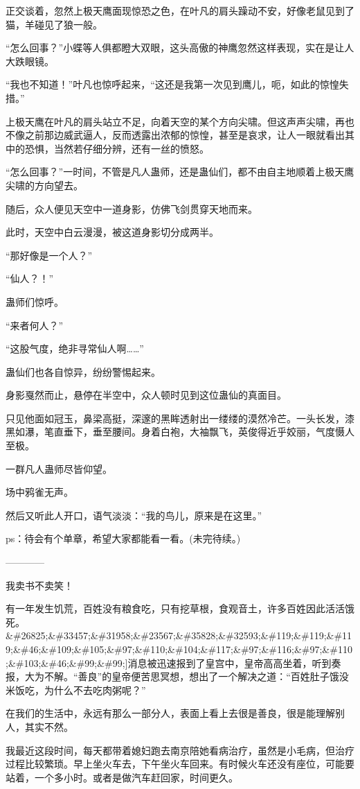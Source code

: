 \begin{this_body}
正交谈着，忽然上极天鹰面现惊恐之色，在叶凡的肩头躁动不安，好像老鼠见到了猫，羊碰见了狼一般。

“怎么回事？”小蝶等人俱都瞪大双眼，这头高傲的神鹰忽然这样表现，实在是让人大跌眼镜。

“我也不知道！”叶凡也惊呼起来，“这还是我第一次见到鹰儿，呃，如此的惊惶失措。”

上极天鹰在叶凡的肩头站立不足，向着天空的某个方向尖啸。但这声声尖啸，再也不像之前那边威武逼人，反而透露出浓郁的惊惶，甚至是哀求，让人一眼就看出其中的恐惧，当然若仔细分辨，还有一丝的愤怒。

“怎么回事？”一时间，不管是凡人蛊师，还是蛊仙们，都不由自主地顺着上极天鹰尖啸的方向望去。

随后，众人便见天空中一道身影，仿佛飞剑贯穿天地而来。

此时，天空中白云漫漫，被这道身影切分成两半。

“那好像是一个人？”

“仙人？！”

蛊师们惊呼。

“来者何人？”

“这股气度，绝非寻常仙人啊……”

蛊仙们也各自惊异，纷纷警惕起来。

身影戛然而止，悬停在半空中，众人顿时见到这位蛊仙的真面目。

只见他面如冠玉，鼻梁高挺，深邃的黑眸透射出一缕缕的漠然冷芒。一头长发，漆黑如瀑，笔直垂下，垂至腰间。身着白袍，大袖飘飞，英俊得近乎姣丽，气度慑人至极。

一群凡人蛊师尽皆仰望。

场中鸦雀无声。

然后又听此人开口，语气淡淡：“我的鸟儿，原来是在这里。”

ps：待会有个单章，希望大家都能看一看。(未完待续。)

------------

我卖书不卖笑！

有一年发生饥荒，百姓没有粮食吃，只有挖草根，食观音土，许多百姓因此活活饿死。\&\#26825;\&\#33457;\&\#31958;\&\#23567;\&\#35828;\&\#32593;\&\#119;\&\#119;\&\#119;\&\#46;\&\#109;\&\#105;\&\#97;\&\#110;\&\#104;\&\#117;\&\#97;\&\#116;\&\#97;\&\#110;\&\#103;\&\#46;\&\#99;\&\#99;]消息被迅速报到了皇宫中，皇帝高高坐着，听到奏报，大为不解。“善良”的皇帝便苦思冥想，想出了一个解决之道：“百姓肚子饿没米饭吃，为什么不去吃肉粥呢？”

在我们的生活中，永远有那么一部分人，表面上看上去很是善良，很是能理解别人，其实不然。

我最近这段时间，每天都带着媳妇跑去南京陪她看病治疗，虽然是小毛病，但治疗过程比较繁琐。早上坐火车去，下午坐火车回来。有时候火车还没有座位，可能要站着，一个多小时。或者是做汽车赶回家，时间更久。


\end{this_body}
